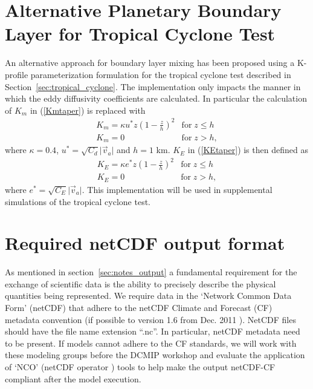 \documentclass[times,doublespace]{fldauth}
\begin{document}
{\begin{appendix}

\section{Alternative Planetary Boundary Layer for Tropical Cyclone Test} \label{sec:BryanBoundaryLayer}

An alternative approach for boundary layer mixing has been proposed using a K-profile parameterization formulation for the tropical cyclone test described in Section~\ref{sec:tropical_cyclone}.  The implementation only impacts the manner in which the eddy diffusivity coefficients are calculated. In particular the calculation of $K_m$ in (\ref{Kmtaper}) is replaced with
\begin{equation} \label{Kmtaper_alt}
\begin{array}{ll}
K_m = \kappa u^* z \left ( 1 -  \frac{z}{h} \right )^2 & \mbox{for} \; z \leq h \\
K_m = 0 & \mbox{for} \; z > h,
\end{array}
\end{equation}
where $\kappa = 0.4$, $u^* = \sqrt{C_d} \vert \vec{v}_{a} \vert$ and $h = 1$ km. $K_E$ in (\ref{KEtaper}) is then defined as
\begin{equation}
\begin{array}{ll}\label{KEtaper_alt}
K_E = \kappa e^* z \left ( 1 -  \frac{z}{h} \right )^2 & \mbox{for} \; z \leq h \\
K_E = 0 & \mbox{for} \; z > h,
\end{array}
\end{equation}
where $e^* = \sqrt{C_E} \vert \vec{v}_{a} \vert$. This implementation will be used in supplemental simulations of the tropical cyclone test.


\section{Required netCDF output format} 
\label{sec:netcdf}
As mentioned in section~\ref{sec:notes_output} a fundamental requirement for the exchange of scientific data is the ability to  precisely describe the physical quantities being represented. We require data in the `Network Common Data Form' (netCDF) \cite{netcdf} that adhere to the netCDF Climate and Forecast (CF) metadata convention (if possible to version 1.6 from Dec. 2011 \cite{netcdf-cf}). NetCDF files should have the file name extension ``.nc''.
In particular, netCDF metadata need to be present. If models cannot adhere to the CF standards, we will work with these modeling groups before the DCMIP workshop and evaluate the application of `NCO' (netCDF operator \cite{nco}) tools to help make the output netCDF-CF compliant after the model execution. 


\end{appendix}}
\end{document}
